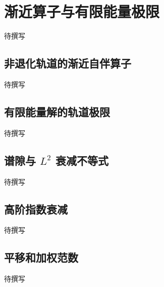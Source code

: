 
% 
% 

\section{渐近算子与有限能量极限}
\label{g4:sec:2502}

待撰写

\subsection{非退化轨道的渐近自伴算子}
\label{g4:subsec:2502:01}
待撰写

\subsection{有限能量解的轨道极限}
\label{g4:subsec:2502:02}
待撰写

\subsection{\texorpdfstring{谱隙与 \(L^2\) 衰减不等式}{谱隙与 L² 衰减不等式}}
\label{g4:subsec:2502:03}
待撰写

\subsection{高阶指数衰减}
\label{g4:subsec:2502:04}
待撰写

\subsection{平移和加权范数}
\label{g4:subsec:2502:05}
待撰写
